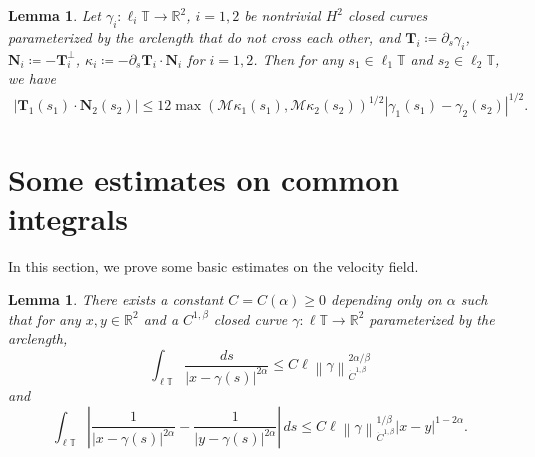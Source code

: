 \documentclass[reqno,centertags,12pt]{amsart}
\newtheorem{lemma}[theorem]{Lemma}
\theoremstyle{definition}
\numberwithin{equation}{section}
\newcommand{\abs}[1]{\left\lvert#1\right\rvert}
\newcommand{\norm}[1]{\left\|#1\right\|}
\newcommand{\bbR}{{\mathbb{R}}}
\newcommand{\bbT}{{\mathbb{T}}}
\begin{document}
\begin{lemma}\label{L3.4}
    Let $\gamma_{i}\colon\ell_{i}\bbT\to\bbR^{2}$, $i=1,2$ be nontrivial $H^{2}$
    closed curves parameterized by the arclength that do not cross each other,
    and $\mathbf{T}_{i}\coloneqq\partial_{s}\gamma_{i}$,
    $\mathbf{N}_{i}\coloneqq-\mathbf{T}_{i}^{\perp}$,
    $\kappa_{i}\coloneqq -\partial_{s}\mathbf{T}_{i}\cdot\mathbf{N}_{i}$ for $i=1,2$.
    Then for any $s_{1}\in\ell_{1}\bbT$ and $s_{2}\in\ell_{2}\bbT$, we have
    \begin{align*}
        \abs{\mathbf{T}_{1}(s_{1})\cdot\mathbf{N}_{2}(s_{2})}
        \leq 12\max\left(\mathcal{M}\kappa_{1}(s_{1}),\mathcal{M}\kappa_{2}(s_{2})\right)^{1/2}
        \abs{\gamma_{1}(s_{1}) - \gamma_{2}(s_{2})}^{1/2}.
    \end{align*}
\end{lemma}


\section{Some estimates on common integrals}\label{S4}

In this section, we prove some basic estimates on the velocity field.

\begin{lemma}\label{L4.1}
    There exists a constant $C=C(\alpha)\geq 0$ depending only on $\alpha$ such that
    for any $x,y\in\bbR^{2}$ and a $C^{1,\beta}$ closed curve
    $\gamma\colon\ell\bbT\to\bbR^{2}$ parameterized by the arclength,
    \[
        \int_{\ell\bbT}\frac{ds}{\abs{x - \gamma(s)}^{2\alpha}}
        \leq C\ell\norm{\gamma}_{\dot{C}^{1,\beta}}^{2\alpha/\beta}
    \]
    and
    \[
        \int_{\ell\bbT}\abs{
            \frac{1}{\abs{x - \gamma(s)}^{2\alpha}}
            - \frac{1}{\abs{y - \gamma(s)}^{2\alpha}}
        }\,ds
        \leq C\ell
        \norm{\gamma}_{\dot{C}^{1,\beta}}^{1/\beta}\abs{x - y}^{1-2\alpha}.
    \]
\end{lemma}
\end{document}
